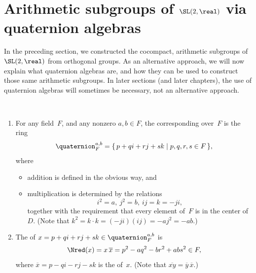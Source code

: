 \begin{exercises}
\end{exercises}








\section{Arithmetic subgroups of \texorpdfstring{$\SL(2,\real)$}{SL(2,R)} via quaternion algebras}
\label{QuaternionAlgSect}

In the preceding section, we constructed the cocompact, arithmetic subgroups of $\SL(2,\real)$ from orthogonal groups. As an alternative approach, we will now explain what quaternion algebras are, and how they can be used to construct those same arithmetic subgroups. In later sections (and later chapters), the use of quaternion algebras will sometimes be necessary, not an alternative approach. 


\begin{defns} \label{QuaternionDefn} \ 
\noprelistbreak
 \begin{enumerate}
 \item For any field~$F$, and any nonzero $a,b \in
F$, the corresponding  over~$F$ is
the ring%
 $$ \quaternion^{a,b}_F
 = \{\, p + qi + rj + sk \mid p,q,r,s \in F \,\} ,$$
 where
 \begin{itemize}
 \item addition is defined in the obvious way, and 
 \item multiplication is determined by the relations
 $$ i^2 = a,
 \ j^2 = b,
 \ ij = k = - ji ,$$ 
 together with the requirement that every element of~$F$ is
in the center of~$D$.
(Note that $k^2 = k \cdot k = (-ji)(ij) = -a j^2 = -ab$.)
 \end{itemize}
 \item The  of $x = p + qi + rj + sk \in
\quaternion^{a,b}_F$ is
 $$ \Nred(x) = x \, \overline x = p^2 - a q^2 - b r^2 + ab s^2 \in F,$$
 where $\overline x = p - qi - rj - sk$ is the  of~$x$.
 (Note that $\overline{xy} = \overline{y} \, \overline{x}$.) 
 \end{enumerate}
 \end{defns}

